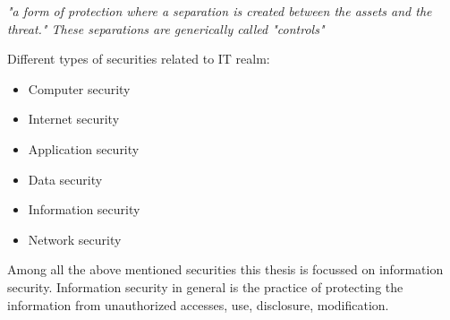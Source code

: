  
 \textit{"a form of protection where a separation is 
created between the assets and the threat." These separations are generically 
called "controls"}
\smallskip



Different types of securities related to IT realm:
\begin{itemize}
\item Computer security
\item Internet security
\item Application security
\item Data security
\item Information security
\item Network security
\end{itemize}

Among all the above mentioned securities this thesis is focussed on information security.
Information security in general is the practice of protecting the information from unauthorized accesses, use,
disclosure, modification. 

